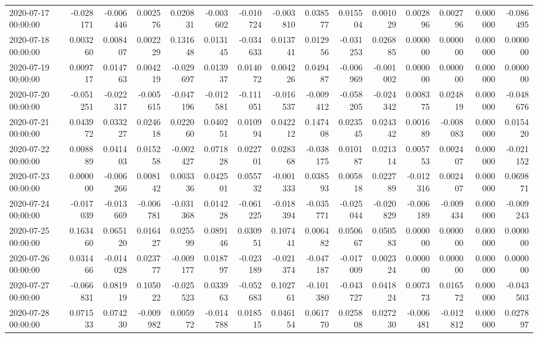 \begin{tabular}{lrrrrrrrrrrrrrr}
2020-07-17 00:00:00 & -0.028171 & -0.006446 & 0.002576 & 0.020831 & -0.003602 & -0.010724 & -0.003810 & 0.038577 & 0.015504 & 0.001029 & 0.002896 & 0.002796 & 0.000000 & -0.086495 \\
2020-07-18 00:00:00 & 0.003260 & 0.008407 & 0.002229 & 0.131648 & 0.013145 & -0.034633 & 0.013741 & 0.012956 & -0.031253 & 0.026885 & 0.000000 & 0.000000 & 0.000000 & 0.000000 \\
2020-07-19 00:00:00 & 0.009717 & 0.014763 & 0.004219 & -0.029697 & 0.013937 & 0.014072 & 0.004226 & 0.049487 & -0.006969 & -0.001002 & 0.000000 & 0.000000 & 0.000000 & 0.000000 \\
2020-07-20 00:00:00 & -0.051251 & -0.022317 & -0.005615 & -0.047196 & -0.012581 & -0.111051 & -0.016537 & -0.009412 & -0.058205 & -0.024342 & 0.008375 & 0.024819 & 0.000000 & -0.048676 \\
2020-07-21 00:00:00 & 0.043972 & 0.033227 & 0.024618 & 0.022060 & 0.040251 & 0.010994 & 0.042212 & 0.147408 & 0.023545 & 0.024342 & 0.001689 & -0.008083 & 0.000000 & 0.015420 \\
2020-07-22 00:00:00 & 0.008889 & 0.041403 & 0.015258 & -0.002427 & 0.071828 & 0.022701 & 0.028368 & -0.038175 & 0.010187 & 0.021314 & 0.005753 & 0.002407 & 0.000000 & -0.021152 \\
2020-07-23 00:00:00 & 0.000000 & -0.006266 & 0.008142 & 0.003336 & 0.042501 & 0.055732 & -0.001333 & 0.038593 & 0.005818 & 0.022789 & -0.012316 & 0.002407 & 0.000000 & 0.069871 \\
2020-07-24 00:00:00 & -0.017039 & -0.013669 & -0.006781 & -0.031368 & 0.014228 & -0.061225 & -0.018394 & -0.035771 & -0.025044 & -0.020829 & -0.006189 & -0.009434 & 0.000000 & -0.009243 \\
2020-07-25 00:00:00 & 0.163460 & 0.065120 & 0.016427 & 0.025599 & 0.089146 & 0.030951 & 0.107441 & 0.006482 & 0.050667 & 0.050583 & 0.000000 & 0.000000 & 0.000000 & 0.000000 \\
2020-07-26 00:00:00 & 0.031466 & -0.014028 & 0.023777 & -0.009177 & 0.018797 & -0.023189 & -0.021374 & -0.047187 & -0.017009 & 0.002324 & 0.000000 & 0.000000 & 0.000000 & 0.000000 \\
2020-07-27 00:00:00 & -0.066831 & 0.081919 & 0.105022 & -0.025523 & 0.033963 & -0.052683 & 0.102761 & -0.101380 & -0.043727 & 0.041824 & 0.007373 & 0.016572 & 0.000000 & -0.043503 \\
2020-07-28 00:00:00 & 0.071533 & 0.074230 & -0.009982 & 0.005972 & -0.014788 & 0.018515 & 0.046154 & 0.061770 & 0.025808 & 0.027230 & -0.006481 & -0.012812 & 0.000000 & 0.027897 \\

\end{tabular}
